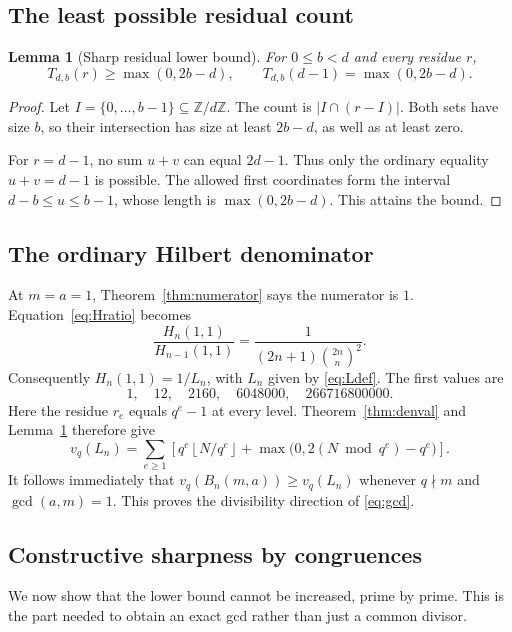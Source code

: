\documentclass[11pt,a4paper]{article}
\numberwithin{equation}{section}
\newtheorem{lemma}[theorem]{Lemma}
\theoremstyle{definition}
\theoremstyle{remark}
\newcommand{\Z}{\mathbb{Z}}
\newcommand{\floor}[1]{\left\lfloor#1\right\rfloor}
\begin{document}
\subsection{The least possible residual count}
\begin{lemma}[Sharp residual lower bound]\label{lem:Tmin}
For $0\leq b<d$ and every residue $r$,
\begin{equation}\label{eq:Tmin}
 T_{d,b}(r)\geq\max(0,2b-d),\qquad
 T_{d,b}(d-1)=\max(0,2b-d).
\end{equation}
\end{lemma}
\begin{proof}
Let $I=\{0,\ldots,b-1\}\subseteq\Z/d\Z$. The count is $|I\cap(r-I)|$. Both sets have size $b$, so their intersection has size at least $2b-d$, as well as at least zero.

For $r=d-1$, no sum $u+v$ can equal $2d-1$. Thus only the ordinary equality $u+v=d-1$ is possible. The allowed first coordinates form the interval $d-b\leq u\leq b-1$, whose length is $\max(0,2b-d)$. This attains the bound.
\end{proof}

\subsection{The ordinary Hilbert denominator}
At $m=a=1$, Theorem~\ref{thm:numerator} says the numerator is $1$. Equation~\eqref{eq:Hratio} becomes
\[
 \frac{H_n(1,1)}{H_{n-1}(1,1)}
 =\frac1{(2n+1)\binom{2n}{n}^2}.
\]
Consequently $H_n(1,1)=1/L_n$, with $L_n$ given by \eqref{eq:Ldef}. The first values are
\[
 1,\quad12,\quad2160,\quad6048000,\quad266716800000.
\]
Here the residue $r_e$ equals $q^e-1$ at every level. Theorem~\ref{thm:denval} and Lemma~\ref{lem:Tmin} therefore give
\begin{equation}\label{eq:Lval}
 v_q(L_n)=\sum_{e\geq1}\left[
 q^e\floor{N/q^e}+\max\bigl(0,2(N\bmod q^e)-q^e\bigr)
 \right].
\end{equation}
It follows immediately that $v_q(B_n(m,a))\geq v_q(L_n)$ whenever $q\nmid m$ and $\gcd(a,m)=1$. This proves the divisibility direction of \eqref{eq:gcd}.

\subsection{Constructive sharpness by congruences}
We now show that the lower bound cannot be increased, prime by prime. This is the part needed to obtain an exact gcd rather than just a common divisor.
\end{document}
